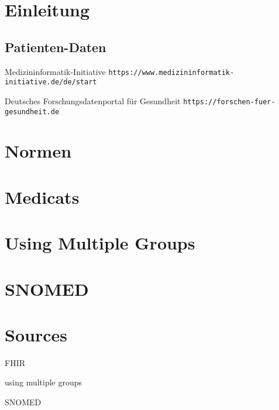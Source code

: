 



\section{Einleitung}

\subsection{Patienten-Daten}

Medizininformatik-Initiative
\texttt{https://www.medizininformatik-initiative.de/de/start}

Deutsches Forschungsdatenportal für Gesundheit
\texttt{https://forschen-fuer-gesundheit.de}

\section{Normen}

\section{Medicats}

\section{Using Multiple Groups}

\section{SNOMED}

\section{Sources}

FHIR \citep{braunstein2022health}

using multiple groups \citep{saripalle2019representing}

SNOMED \citep{icd10-to-snomed}




